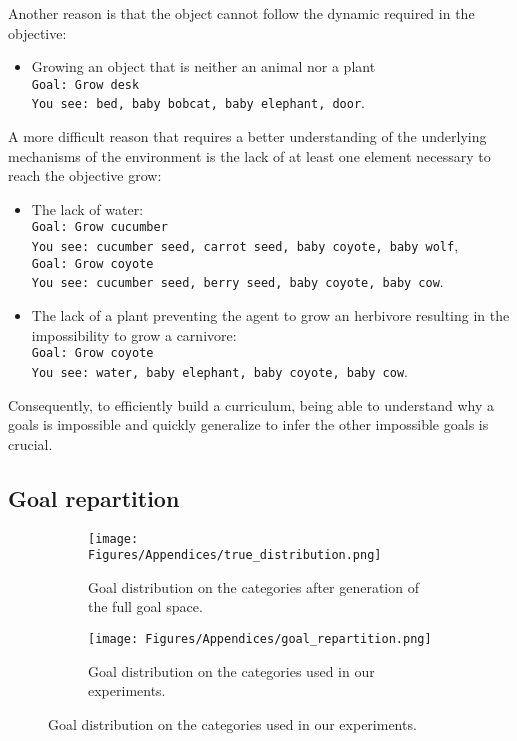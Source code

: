 Another reason is that the object cannot follow the dynamic required in the objective: 
\begin{itemize}
    \item Growing an object that is neither an animal nor a plant \\
    \texttt{Goal: Grow desk \\
You see: bed, baby bobcat, baby elephant, door}.
\end{itemize}

A more difficult reason that requires a better understanding of the underlying mechanisms of the environment is the lack of at least one element necessary to reach the objective grow:
\begin{itemize}
    \item The lack of water: \\
    \texttt{Goal: Grow cucumber \\
You see: cucumber seed, carrot seed, baby coyote, baby wolf}, \\
\texttt{Goal: Grow coyote \\
You see: cucumber seed, berry seed, baby coyote, baby cow}.
    \item The lack of a plant preventing the agent to grow an herbivore resulting in the impossibility to grow a carnivore: \\
    \texttt{Goal: Grow coyote \\
You see: water, baby elephant, baby coyote, baby cow}.
\end{itemize}

Consequently, to efficiently build a curriculum, being able to understand why a goals is impossible and quickly generalize to infer the other impossible goals is crucial.

\subsection{Goal repartition}
\label{app:goal_repartition}

\begin{figure}
\centering
\begin{subfigure}{.475\textwidth}
    \centering
    \texttt{[image: Figures/Appendices/true\_distribution.png]}  
    \caption{Goal distribution on the categories after generation of the full goal space.}
    \label{fig:true_distribution}
\end{subfigure}
\begin{subfigure}{.475\textwidth}
    \centering
    \texttt{[image: Figures/Appendices/goal\_repartition.png]}  
    \caption{Goal distribution on the categories used in our experiments.}
    \label{fig:goal_distribution}
\end{subfigure}
    \label{fig:goal_repartition}
\end{figure}

